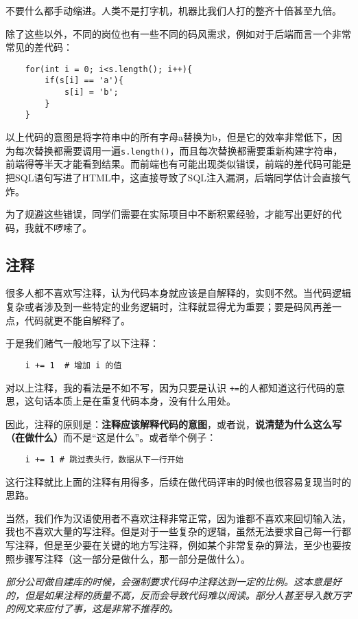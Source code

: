 \documentclass[../main.tex]{subfiles}
\begin{document}
不要什么都手动缩进。人类不是打字机，机器比我们人打的整齐十倍甚至九倍。

除了这些以外，不同的岗位也有一些不同的码风需求，例如对于后端而言一个非常常见的差代码：
\begin{verbatim}
    for(int i = 0; i<s.length(); i++){
        if(s[i] == 'a'){
            s[i] = 'b';
        }
    }
\end{verbatim}
以上代码的意图是将字符串中的所有字母a替换为b，但是它的效率非常低下，因为每次替换都需要调用一遍\texttt{s.length()}，而且每次替换都需要重新构建字符串，前端得等半天才能看到结果。而前端也有可能出现类似错误，前端的差代码可能是把SQL语句写进了HTML中，这直接导致了SQL注入漏洞，后端同学估计会直接气炸。

为了规避这些错误，同学们需要在实际项目中不断积累经验，才能写出更好的代码，我就不啰嗦了。

\subsection{注释}

很多人都不喜欢写注释，认为代码本身就应该是自解释的，实则不然。当代码逻辑复杂或者涉及到一些特定的业务逻辑时，注释就显得尤为重要；要是码风再差一点，代码就更不能自解释了。

于是我们赌气一般地写了以下注释：
\begin{verbatim}
    i += 1  # 增加 i 的值
\end{verbatim}

对以上注释，我的看法是不如不写，因为只要是认识 \texttt{+=}的人都知道这行代码的意思，这句话本质上是在重复代码本身，没有什么用处。

因此，注释的原则是：\textbf{注释应该解释代码的意图}，或者说，\textbf{说清楚为什么这么写（在做什么）}而不是“这是什么”。或者举个例子：

\begin{verbatim}
    i += 1 # 跳过表头行，数据从下一行开始
\end{verbatim}

这行注释就比上面的注释有用得多，后续在做代码评审的时候也很容易复现当时的思路。

当然，我们作为汉语使用者不喜欢注释非常正常，因为谁都不喜欢来回切输入法，我也不喜欢大量的写注释。但是对于一些复杂的逻辑，虽然无法要求自己每一行都写注释，但是至少要在关键的地方写注释，例如某个非常复杂的算法，至少也要按照步骤写注释（这一部分是做什么，那一部分是做什么）。

\emph{部分公司做自建库的时候，会强制要求代码中注释达到一定的比例。这本意是好的，但是如果注释的质量不高，反而会导致代码难以阅读。部分人甚至导入数万字的网文来应付了事，这是非常不推荐的。}
\end{document}
